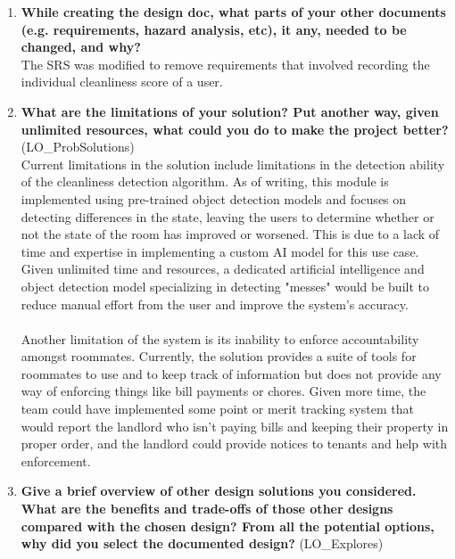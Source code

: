 \documentclass[12pt, titlepage]{article}
\begin{document}
\begin{enumerate}
  \item \textbf{While creating the design doc, what parts of your other documents (e.g.
  requirements, hazard analysis, etc), it any, needed to be changed, and why?}\\
  The SRS was modified to remove requirements that involved recording the individual cleanliness score of a user. 
  \item \textbf{What are the limitations of your solution?  Put another way, given
  unlimited resources, what could you do to make the project better?} (LO\_ProbSolutions)\\
  Current limitations in the solution include limitations in the detection ability of the cleanliness detection algorithm. As of writing, this module is implemented using pre-trained object detection models and focuses on detecting differences in the state, leaving the users to determine whether or not the state of the room has improved or worsened. This is due to a lack of time and expertise in implementing a custom AI model for this use case. Given unlimited time and resources, a dedicated artificial intelligence and object detection model specializing in detecting "messes" would be built to reduce manual effort from the user and improve the system's accuracy.\\\\
  Another limitation of the system is its inability to enforce accountability amongst roommates. Currently, the solution provides a suite of tools for roommates to use and to keep track of information but does not provide any way of enforcing things like bill payments or chores. Given more time, the team could have implemented some point or merit tracking system that would report the landlord who isn't paying bills and keeping their property in proper order, and the landlord could provide notices to tenants and help with enforcement.
  \item \textbf{Give a brief overview of other design solutions you considered.  What
  are the benefits and trade-offs of those other designs compared with the chosen
  design?  From all the potential options, why did you select the documented design?}
  (LO\_Explores)\\

\end{enumerate}
\end{document}
